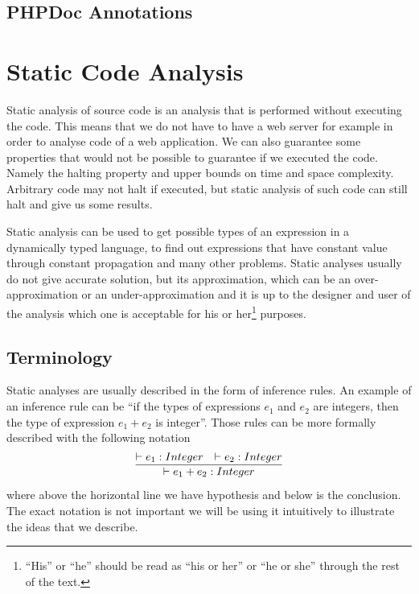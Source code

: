     \subsection{PHPDoc Annotations}
    
    \section{Static Code Analysis}       
        Static analysis of source code is an analysis that is performed without 
        executing the code. This means that we do not have to have a
        web server for example in order to analyse code of a web application. 
        We can also guarantee some properties that would not be possible to 
        guarantee if we executed the code. Namely the halting property and 
        upper bounds on time and space complexity. Arbitrary code may not 
        halt if executed, but static analysis of such code can still halt 
        and give us some results.
        
        Static analysis can be used to get possible types of an expression in 
        a dynamically typed language, to find out expressions that have constant 
        value through constant propagation and many other problems. 
        Static analyses usually do not give accurate solution, but 
        its approximation, which can be an over-approximation or 
        an under-approximation and it is up to the designer and user of the analysis 
        which one is acceptable for his or her\footnote{``His'' or ``he'' 
        should be read as ``his or her'' or ``he or she'' through the rest of the text.} 
        purposes.                
        
        \subsection{Terminology}
        
        Static analyses are usually described in the form of inference rules. 
        An example of an inference rule can be 
        ``if the types of expressions $e_1$ and $e_2$ are integers, then the type of 
        expression $e_1+e_2$ is integer''. Those rules can be more formally 
        described with the following notation        
        $$
        \infer{\vdash e_1+e_2 : Integer}{\vdash e_1 : Integer & \vdash e_2 : Integer}
        $$        
        where above the horizontal line we have hypothesis and below is 
        the conclusion. The exact notation is not important we will be using it 
        intuitively to illustrate the ideas that we describe.
        
